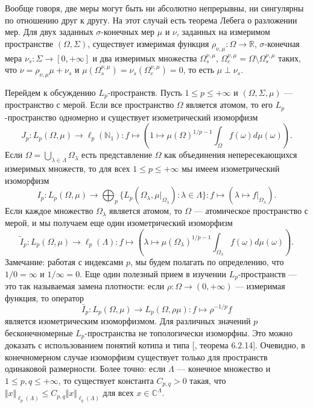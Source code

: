 Вообще говоря, две меры могут быть ни абсолютно непрерывны, ни сингулярны по
отношению друг к другу. На этот случай есть теорема Лебега о разложении мер. Для
двух заданных $\sigma$-конечных мер $\mu$ и $\nu$, заданных на измеримом
пространстве $(\Omega,\Sigma)$, существует измеримая функция
$\rho_{\nu,\mu}:\Omega\to\mathbb{R}$, $\sigma$-конечная мера
$\nu_s:\Sigma\to[0,+\infty]$ и два измеримых множества $\Omega_s^{\nu,\mu}$,
$\Omega_c^{\nu,\mu}=\Omega\setminus\Omega_s^{\nu,\mu}$ таких, что
$\nu=\rho_{\nu,\mu}\mu+\nu_s$ и
$\mu(\Omega_s^{\nu,\mu})=\nu_s(\Omega_c^{\nu,\mu})=0$, то есть $\mu\perp\nu_s$.

Перейдем к обсуждению $L_p$-пространств. Пусть $1\leq p\leq+\infty$ и
$(\Omega,\Sigma,\mu)$ --- пространство с мерой. Если все пространство $\Omega$
является атомом, то его $L_p$-пространство одномерно и существует изометрический
изоморфизм
$$
J_p
:L_p(\Omega,\mu)\to \ell_p(\mathbb{N}_1)
:f\mapsto{\left(
    1\mapsto {\mu(\Omega)}^{1/p-1}\int_{\Omega} f(\omega)d\mu(\omega)
\right)}.
$$
Если $\Omega=\bigcup_{\lambda\in\Lambda}\Omega_\lambda$ есть представление
$\Omega$ как объединения непересекающихся измеримых множеств, то для всех $1\leq
p\leq+\infty$ мы имеем изометрический изоморфизм
$$
I_p:L_p(\Omega,\mu)\to \bigoplus\nolimits_p \{ 
    L_p(\Omega_\lambda,\mu|_{\Omega_\lambda}):\lambda\in\Lambda 
 \}
: f\mapsto (\lambda\mapsto f|_{\Omega_\lambda}).
$$
Если каждое множество $\Omega_\lambda$ является атомом, то $\Omega$ ---
атомическое пространство с мерой, и мы получаем еще один изометрический
изоморфизм
$$
\widetilde{I}_p:L_p(\Omega,\mu)\to \ell_p(\Lambda)
:f\mapsto\left (\lambda\mapsto {\mu(\Omega_\lambda)}^{1/p-1}
\int_{\Omega_\lambda} f(\omega)d\mu(\omega)\right).
$$
Замечание: работая с индексами $p$, мы будем полагать по определению, что
$1/0=\infty$ и $1/\infty=0$. Еще один полезный прием в изучении
$L_p$-пространств --- это так называемая замена плотности: если
$\rho:\Omega\to(0,+\infty)$ --- измеримая функция, то оператор
$$
\bar{I}_p:L_p(\Omega,\mu)\to L_p(\Omega,\rho\mu): f\mapsto\rho^{-1/p} f
$$
является изометрическим изоморфизмом. Для различных значений $p$
бесконечномерные $L_p$-пространства не топологически изоморфны. Это можно
доказать с использованием понятий котипа и типа [\cite{KalAlbTopicsBanSpTh},
теорема 6.2.14]. Очевидно, в конечномерном случае изоморфизм существует только
для пространств одинаковой размерности. Более точно: если $\Lambda$ --- конечное
множество и $1\leq p,q\leq +\infty$, то существует константа $C_{p,q}>0$ такая,
что $\Vert x\Vert_{\ell_p(\Lambda)}\leq C_{p,q}\Vert x\Vert_{\ell_q(\Lambda)}$
для всех $x\in\mathbb{C}^\Lambda$.

